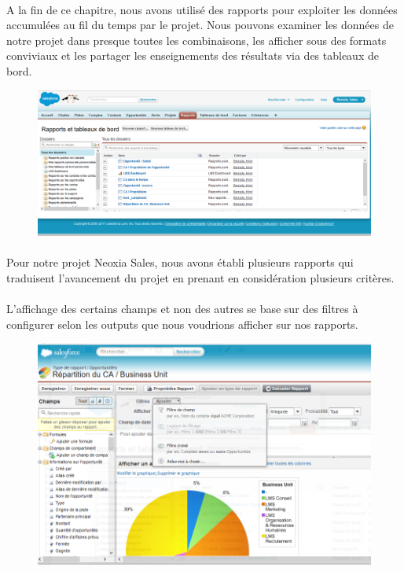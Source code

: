\documentclass[a4paper, 12pt]{report}
\begin{document}
\begin{itemize}
\paragraph{}
A la fin de ce chapitre, nous avons utilisé des rapports pour exploiter les données accumulées au fil du temps par le projet. Nous pouvons examiner les données de notre projet dans presque toutes les combinaisons, les afficher sous des formats conviviaux et les partager les enseignements des résultats via des tableaux de bord.
\begin{figure}[H]
	\centering
		\includegraphics{rapportettb.PNG}
	\label{fig:Objet rapports}
\end{figure}
\paragraph{}
Pour notre projet Neoxia Sales, nous avons établi plusieurs rapports qui traduisent l'avancement du projet en prenant en considération plusieurs critères.
\paragraph{}
L'affichage des certains champs et non des autres se base sur des filtres à configurer selon les outputs que nous voudrions afficher sur nos rapports.
\begin{figure}[H]
	\centering
		\includegraphics{rapportBU.PNG}
	\label{fig:Application des filtres sur le rapport}
\end{figure}

\end{itemize}
\end{document}
